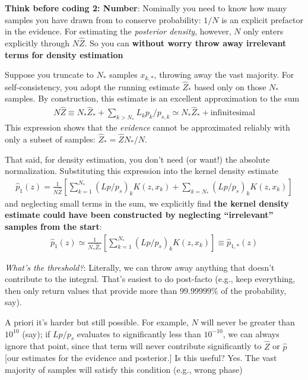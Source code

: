 \documentclass[twocolumn,prd,nofootinbib]{revtex4}
\begin{document}
\begin{widetext}
\begin{shaded}
\noindent \textbf{Think before coding 2: Number}:  Nominally you need to know how many samples you have drawn from  to
conserve probability: $1/N$ is an explicit prefactor in the evidence.  For estimating the \emph{posterior density}, however, $N$ only enters explicitly through $N
\hat{Z}$.  So you can \textbf{without worry throw away irrelevant terms for density estimation}

Suppose you truncate to $N_*$ samples $x_{k,*}$, throwing away the vast majority.  For self-consistency, you adopt the
running estimate $\hat{Z}_*$ based only on those $N_*$ samples.  By construction, this estimate is an excellent
approximation to the sum
\begin{eqnarray}
N \hat{Z} \equiv N_* \hat{Z}_* + \sum_{k>N_*} L_k p_k/p_{s,k}  \simeq N_* \hat{Z}_* + \text{infinitesimal}
\end{eqnarray}
This expression shows that the \emph{evidence} cannot be approximated reliably with only a subset of samples: $\hat{Z}_*
=\hat{Z}N_*/N$.

That said, for density estimation, you don't need (or want!) the absolute normalization. Substituting this expression  into the kernel density estimate
\begin{eqnarray}
\hat{p}_1(z)  = \frac{1}{N \hat{Z}} [\sum_{k=1}^{N_*} (L p/p_s)_k K(z,x_k) + \sum_{k=N_*} (L p/p_s)_k K(z,x_k)]
\end{eqnarray}
and neglecting small terms in the sum, we explicitly find \textbf{the kernel density estimate could have been
  constructed by neglecting ``irrelevant'' samples from the start}:
\begin{eqnarray}
\hat{p}_1(z) \simeq \frac{1}{N_* \hat{Z}_*}[\sum_{k=1}^{N_*} (L p/p_s)_k K(z,x_k)] \equiv \hat{p}_{1,*}(z)
\end{eqnarray}


\noindent \emph{What's the threshold?}: Literally, we can throw away anything that doesn't contribute to the integral.
That's easiest to do post-facto (e.g., keep everything, then only return values that provide more than $99.99999\%$ of
the probability, say).  

A priori it's harder but still possible.  For example, $N$ will never be greater than $10^{10}$ (say); if $L p/p_s$
evaluates to significantly less than $10^{-10}$, we can always ignore that point, since that term will never contribute
significantly to $\hat{Z}$ or $\hat{p}$ [our estimates for the evidence and posterior.]
%
Is this useful?  Yes.  The vast majority of samples will satisfy this condition (e.g., wrong phase)
\end{shaded}





\end{widetext}
\end{document}
